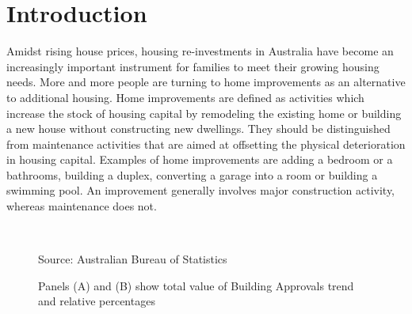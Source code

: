 \documentclass{article}
\begin{document}
\section{Introduction}

Amidst rising house prices, housing re-investments in Australia have become an increasingly important instrument for families to meet their growing housing needs. More and more people are turning to home improvements as an alternative to additional housing. Home improvements are defined as activities which increase the stock of housing capital by remodeling the existing home or building a new house without constructing new dwellings. They should be distinguished from maintenance activities that are aimed at offsetting the physical deterioration in housing capital. Examples of home improvements are adding a bedroom or a bathrooms, building a duplex, converting a garage into a room or building a swimming pool. An improvement generally involves major construction activity, whereas maintenance does not.

\begin{figure}[!ht]
\centering
  \    
  \  
 \caption{\small{Panels (A) and (B) show total value of Building Approvals trend and relative percentages}}
\label{fig:Total_Value_of_Building_Approvals}
Source: \scriptsize{Australian Bureau of Statistics}
\end{figure}
\end{document}
